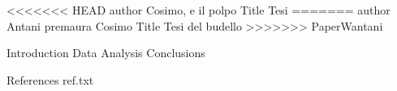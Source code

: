 <<<<<<< HEAD
author Cosimo, e il polpo
Title Tesi
=======
author Antani premaura Cosimo
Title Tesi del budello
>>>>>>> PaperWantani

Introduction 
Data
Analysis
Conclusions

References
ref.txt